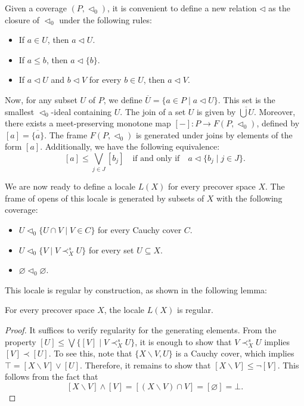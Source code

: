 \documentclass[reqno]{amsart}
\theoremstyle{definition}
\theoremstyle{remark}
\numberwithin{figure}{section}
\newcommand{\rb}{\prec}
\begin{document}
Given a coverage $(P,\triangleleft_0)$, it is convenient to define a new relation $\triangleleft$ as the closure of $\triangleleft_0$ under the following rules:
\begin{itemize}
\item If $a \in U$, then $a \triangleleft U$.
\item If $a \leq b$, then $a \triangleleft \{ b \}$.
\item If $a \triangleleft U$ and $b \triangleleft V$ for every $b \in U$, then $a \triangleleft V$.
\end{itemize}

Now, for any subset $U$ of $P$, we define $\overline{U} = \{ a \in P \mid a \triangleleft U \}$.
This set is the smallest $\triangleleft_0$-ideal containing $U$.
The join of a set $U$ is given by $\overline{\bigcup U}$.
Moreover, there exists a meet-preserving monotone map $[-] : P \to F(P,\triangleleft_0)$, defined by $[a] = \overline{ \{ a \} }$.
The frame $F(P,\triangleleft_0)$ is generated under joins by elements of the form $[a]$.
Additionally, we have the following equivalence:
\[
[a] \leq \bigvee_{j \in J} [b_j] \quad \text{if and only if} \quad a \triangleleft \{ b_j \mid j \in J \}.
\]

We are now ready to define a locale $L(X)$ for every precover space $X$.
The frame of opens of this locale is generated by subsets of $X$ with the following coverage:
\begin{itemize}
\item $U \triangleleft_0 \{ U \cap V \mid V \in C \}$ for every Cauchy cover $C$.
\item $U \triangleleft_0 \{ V \mid V \rb^s_X U \}$ for every set $U \subseteq X$.
\item $\varnothing \triangleleft_0 \varnothing$.
\end{itemize}

This locale is regular by construction, as shown in the following lemma:

\begin{lem}
For every precover space $X$, the locale $L(X)$ is regular.
\end{lem}
\begin{proof}
It suffices to verify regularity for the generating elements.
From the property $[U] \leq \bigvee \{ [V] \mid V \rb^s_X U \}$, it is enough to show that $V \rb^s_X U$ implies $[V] \rb [U]$.
To see this, note that $\{ X \backslash V, U \}$ is a Cauchy cover, which implies $\top = [X \backslash V] \vee [U]$.
Therefore, it remains to show that $[X \backslash V] \leq \neg [V]$.
This follows from the fact that 
\[
[X \backslash V] \wedge [V] = [(X \backslash V) \cap V] = [\varnothing] = \bot.
\]
\end{proof}
\end{document}
